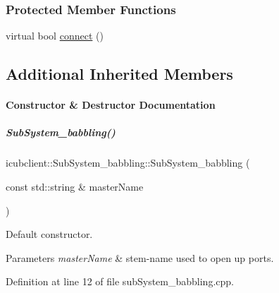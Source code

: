 \subsubsection*{Protected Member Functions}
\begin{DoxyCompactItemize}
\item 
virtual bool \hyperlink{group__icubclient__subsystems_a571ba8f32c2ccf03610dd06866749d95}{connect} ()
\end{DoxyCompactItemize}
\subsection*{Additional Inherited Members}


\paragraph{Constructor \& Destructor Documentation}
\mbox{\label{group__icubclient__subsystems_a7a48e0c4846d9f35586d0f5b3cd95ac7}} 
\subparagraph{\texorpdfstring{Sub\+System\+\_\+babbling()}{SubSystem\_babbling()}}
{\footnotesize\ttfamily icubclient\+::\+Sub\+System\+\_\+babbling\+::\+Sub\+System\+\_\+babbling (\begin{DoxyParamCaption}\item[{const std\+::string \&}]{master\+Name }\end{DoxyParamCaption})}



Default constructor. 


\begin{DoxyParams}{Parameters}
{\em master\+Name} & stem-\/name used to open up ports. \\
\hline
\end{DoxyParams}


Definition at line 12 of file sub\+System\+\_\+babbling.\+cpp.



